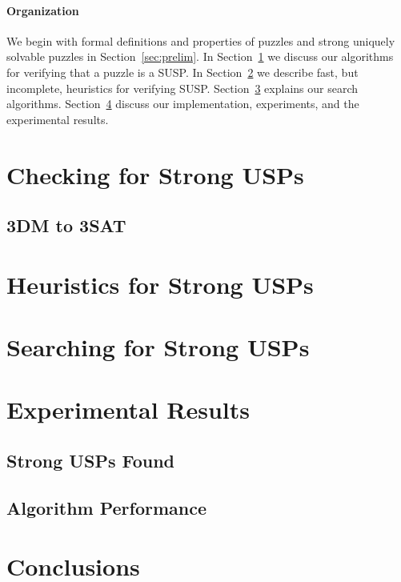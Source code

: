 \documentclass[11pt]{article}
\begin{document}
\paragraph{Organization}
We begin with formal definitions and properties of puzzles and strong
uniquely solvable puzzles in Section~\ref{sec:prelim}.  In
Section~\ref{sec:check} we discuss our algorithms for verifying that a
puzzle is a SUSP.  In Section~\ref{sec:heuristic} we describe fast,
but incomplete, heuristics for verifying SUSP.
Section~\ref{sec:search} explains our search algorithms.
Section~\ref{sec:results} discuss our implementation, experiments, and
the experimental results.

\section{Checking for Strong USPs}
\label{sec:check}

\subsection{3DM to 3SAT}
\label{subsec:3sat}

\section{Heuristics for Strong USPs}
\label{sec:heuristic}

\section{Searching for Strong USPs}
\label{sec:search}

\section{Experimental Results}
\label{sec:results}

\subsection{Strong USPs Found}
\label{subsec:usps_found}

\subsection{Algorithm Performance}
\label{subsec:performance}

\section{Conclusions}
\end{document}
